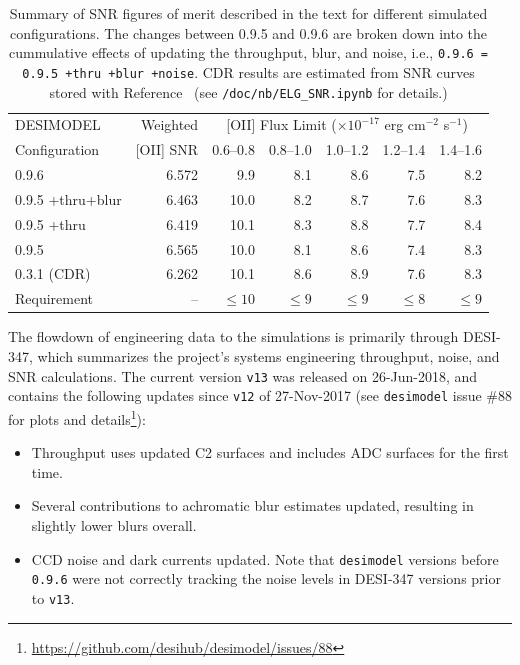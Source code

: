 \documentclass[12pt]{article}
\begin{document}
\begin{table}[htb]
\begin{center}
\begin{tabular}{lrrrrrr}
    DESIMODEL     & Weighted  & \multicolumn{5}{c}{[OII] Flux Limit ($\times 10^{-17}$ erg cm$^{-2}$ s$^{-1}$)} \\
    Configuration & [OII] SNR & 0.6--0.8 & 0.8--1.0 & 1.0--1.2 & 1.2--1.4 & 1.4--1.6 \\
    \hline
    0.9.6            &  6.572 &  9.9 &  8.1 &  8.6 &  7.5 &  8.2 \\
    0.9.5 +thru+blur &  6.463 & 10.0 &  8.2 &  8.7 &  7.6 &  8.3 \\
    0.9.5 +thru      &  6.419 & 10.1 &  8.3 &  8.8 &  7.7 &  8.4 \\
    0.9.5            &  6.565 & 10.0 &  8.1 &  8.6 &  7.4 &  8.3 \\
    0.3.1 (CDR)      &  6.262 & 10.1 &  8.6 &  8.9 &  7.6 &  8.3 \\
    \hline
    Requirement      &     -- & $\le 10$ & $\le 9$ & $\le 9$ & $\le 8$ & $\le 9$ \\
    \hline
\end{tabular}
\caption{Summary of SNR figures of merit described in the text for different simulated configurations.
The changes between 0.9.5 and 0.9.6 are broken down into the cummulative effects of updating the throughput, blur, and noise,
i.e., {\tt 0.9.6 = 0.9.5 +thru +blur +noise}.  CDR results are estimated from SNR curves stored with
Reference~\cite{desi-867} (see {\tt /doc/nb/ELG\_SNR.ipynb} for details.)}
\label{tab:results-summary}
\end{center}
\end{table}

The flowdown of engineering data to the simulations is primarily through DESI-347\cite{desi-347}, which summarizes
the project's systems engineering throughput, noise, and SNR calculations.  The current version {\tt v13} was released on 26-Jun-2018,
and contains the following updates since {\tt v12} of 27-Nov-2017 (see {\tt desimodel} issue \#88 for plots and details\footnote{
\url{https://github.com/desihub/desimodel/issues/88}}):
\begin{itemize}
    \item Throughput uses updated C2 surfaces and includes ADC surfaces for the first time.
    \item Several contributions to achromatic blur estimates updated, resulting in slightly lower blurs overall.
    \item CCD noise and dark currents updated. Note that {\tt desimodel} versions before {\tt 0.9.6} were not correctly
    tracking the noise levels in DESI-347 versions prior to {\tt v13}.
\end{itemize}
\end{document}
